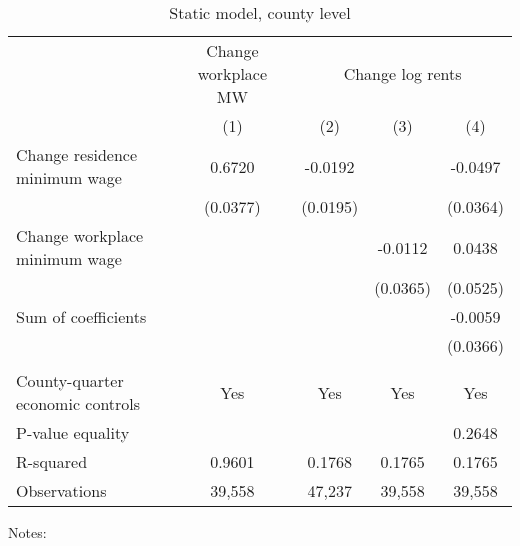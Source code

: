 \begin{table}
    \caption{Static model, county level}
    \label{tab:static_county}

    \begin{tabular}{l*{4}{c}}
    \toprule
                                        & \multicolumn{1}{c}{Change workplace MW}
                                        & \multicolumn{3}{c}{Change log rents}  \\ \cmidrule(lr){2-2}\cmidrule(lr){3-5}
                                              & (1)   & (2)   & (3)   & (4)      \\ \midrule
    Change residence minimum wage             &  0.6720  &  -0.0192  &       &  -0.0497     \\
                                              & (0.0377) & (0.0195) &       & (0.0364)    \\
    Change workplace minimum wage             &       &       &  -0.0112  & 0.0438      \\
                                              &       &       & (0.0365) & (0.0525)    \\ \midrule
    Sum of coefficients                       &       &       &       &  -0.0059     \\
                                              &       &       &       & (0.0366)    \\
                                              &       &       &       &          \\ \midrule
    County-quarter economic controls          &  Yes  & Yes   & Yes   & Yes      \\
    P-value equality                          &       &       &       & 0.2648      \\
    R-squared                                 &  0.9601  &  0.1768  &  0.1765  & 0.1765      \\
    Observations                              & 39,558  & 47,237  & 39,558  & 39,558     \\\bottomrule
    \end{tabular}

    \begin{minipage}{.95\textwidth} \footnotesize
        \vspace{2mm}
        Notes: 
    \end{minipage}
\end{table}

